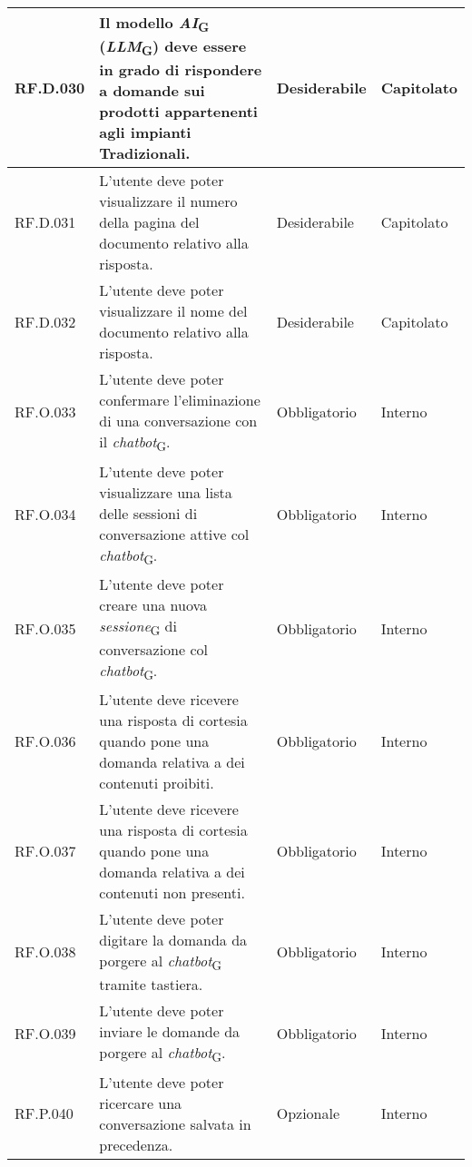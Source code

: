 \begin{table}[H]
\centering
    \begin{tabular}{|C{2.7cm}|L{7.2cm}|C{2.7cm}|C{2cm}|}
        \hline
        RF.D.030 & Il modello \textit{AI}\textsubscript{G} (\textit{LLM}\textsubscript{G}) deve essere in grado di rispondere a domande sui prodotti appartenenti agli impianti Tradizionali.
         & Desiderabile & Capitolato \\
        \hline
        RF.D.031 & L’utente deve poter visualizzare il numero della pagina del documento relativo alla risposta.
         & Desiderabile & Capitolato \\
        \hline
        RF.D.032 & L’utente deve poter visualizzare il nome del documento relativo alla
        risposta.
         & Desiderabile & Capitolato \\
        \hline
        RF.O.033 & L’utente deve poter confermare l'eliminazione di una conversazione con il \textit{chatbot}\textsubscript{G}.
         & Obbligatorio & Interno \\
        \hline
        RF.O.034 & L’utente deve poter visualizzare una lista delle
        sessioni di conversazione attive col \textit{chatbot}\textsubscript{G}.
         & Obbligatorio & Interno \\
        \hline
        RF.O.035 & L’utente deve poter creare una nuova \textit{sessione}\textsubscript{G} di conversazione col \textit{chatbot}\textsubscript{G}.
         & Obbligatorio & Interno \\
        \hline
        RF.O.036 & L’utente deve ricevere una risposta di cortesia quando pone una domanda relativa a dei contenuti proibiti.
         & Obbligatorio & Interno \\
        \hline
        RF.O.037 & L’utente deve ricevere una risposta di cortesia quando pone una domanda relativa a dei contenuti non presenti.
         & Obbligatorio & Interno \\
        \hline
        RF.O.038 & L’utente deve poter digitare la domanda da porgere al \textit{chatbot}\textsubscript{G} tramite tastiera.
         & Obbligatorio & Interno \\
        \hline
        RF.O.039 & L’utente deve poter inviare le domande da porgere al \textit{chatbot}\textsubscript{G}.
         & Obbligatorio & Interno \\
        \hline
        RF.P.040 & L’utente deve poter ricercare una conversazione salvata in precedenza.
         & Opzionale & Interno \\
        \hline

\end{tabular}
\end{table}
